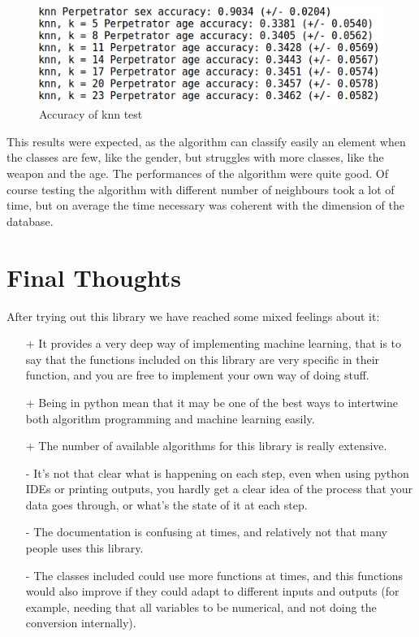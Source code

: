 \documentclass[12pt]{report}
\begin{document}
\begin{figure}[!ht]
  \centering
  \includegraphics[width=0.7\linewidth]{../Images/knnAccuracy.png}
  \caption{Accuracy of knn test}
\end{figure}

This results were expected, as the algorithm can classify easily an element when the classes are few, like the gender, but struggles with more classes, like the weapon and the age.
\newline
The performances of the algorithm were quite good. Of course testing the algorithm with different number of neighbours took a lot of time, but on average the time necessary was coherent with the dimension of the database.

\section{Final Thoughts} 
After trying out this library we have reached some mixed feelings about it:
\begin{itemize}
\item[+] It provides a very deep way of implementing machine learning, that is to say that the functions included on this library are very specific in their function, and you are free to implement your own way of doing stuff.
\item[+] Being in python mean that it may be one of the best ways to intertwine both algorithm programming and machine learning easily.
\item[+] The number of available algorithms for this library is really extensive.
\item[-] It's not that clear what is happening on each step, even when using python IDEs or printing outputs, you hardly get a clear idea of the process that your data goes through, or what's the state of it at each step.
\item[-] The documentation is confusing at times, and relatively not that many people uses this library.
\item[-] The classes included could use more functions at times, and this functions would also improve if they could adapt to different inputs and outputs (for example, needing that all variables to be numerical, and not doing the conversion internally).
\end{itemize}
\end{document}
